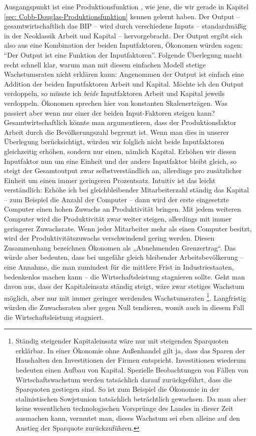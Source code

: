 Ausgangspunkt ist eine Produktionsfunktion \parencite[S. 94]{Samuelson1989}, wie jene, die wir gerade in Kapitel \ref{sec: Cobb-Douglas-Produktionsfunktion} kennen gelernt haben.  Der Output – gesamtwirtschaftlich das BIP – wird durch verschiedene Inputs – standardmäßig in der Neoklassik Arbeit und Kapital – hervorgebracht. Der Output ergibt sich also aus eine Kombination der beiden Inputfaktoren, Ökonomen würden sagen: "`Der Output ist eine Funktion der Inputfaktoren"'. 
Folgende Überlegung macht recht schnell klar, warum man mit diesem einfachen Modell stetige Wachstumsraten nicht erklären kann: Angenommen der Output ist einfach eine Addition der beiden Inputfaktoren Arbeit und Kapital. Möchte ich den Output verdoppeln, so müsste ich \textit{beide} Inputfaktoren Arbeit und Kapital jeweils verdoppeln. Ökonomen sprechen hier von konstanten Skalenerträgen. 
Was passiert aber wenn nur einer der beiden Input-Faktoren steigen kann? Gesamtwirtschaftlich könnte man argumentieren, dass der Produktionsfaktor Arbeit durch die Bevölkerungszahl begrenzt ist. Wenn man dies in unserer Überlegung berücksichtigt, würden wir folglich nicht beide Inputfaktoren gleichzeitig erhöhen, sondern nur einen, nämlich Kapital. Erhöhen wir diesen Inputfaktor nun um eine Einheit und der andere Inputfaktor bleibt gleich, so steigt der Gesamtoutput zwar selbstverständlich an, allerdings pro zusätzlicher Einheit um einen immer geringeren Prozentsatz. Intuitiv ist das leicht verständlich: Erhöhe ich bei gleichbleibender Mitarbeiterzahl ständig das Kapital – zum Beispiel die Anzahl der Computer – dann wird der erste eingesetzte Computer einen hohen Zuwachs an Produktivität bringen. Mit jedem weiteren Computer wird die Produktivität zwar weiter steigen, allerdings mit immer geringerer Zuwachsrate. Wenn jeder Mitarbeiter mehr als einen Computer besitzt, wird der Produktivitätszuwachs verschwindend gering werden. Diesen Zusammenhang bezeichnen Ökonomen als „Abnehmenden Grenzertrag“.
Das würde aber bedeuten, dass bei ungefähr gleich bleibender Arbeitsbevölkerung – eine Annahme, die man zumindest für die mittlere Frist in Industriestaaten, bedenkenlos machen kann – die Wirtschaftsleistung stagnieren sollte. Geht man davon aus, dass der Kapitaleinsatz ständig steigt, wäre zwar stetiges Wachstum möglich, aber nur mit immer geringer werdenden Wachstumsraten \footnote{Ständig steigender Kapitaleinsatz wäre nur mit steigenden Sparquoten erklärbar. In einer Ökonomie ohne Außenhandel gilt ja, dass das Sparen der Haushalten den Investitionen der Firmen entspricht. Investitionen wiederum bedeuten einen Aufbau von Kapital. Spezielle Beobachtungen von Fällen von Wirtschaftswachstum werden tatsächlich darauf zurückgeführt, dass die Sparquoten gestiegen sind. So ist zum Beispiel die Ökonomie in der stalinistischen Sowjetunion tatsächlich beträchtlich gewachsen. Da man aber keine wesentlichen technologischen Vorsprünge des Landes in dieser Zeit ausmachen kann, vermutet man, dieses Wachstum sei eben alleine auf den Anstieg der Sparquote zurückzuführen.}. Langfristig würden die Zuwachsraten aber gegen Null tendieren, womit auch in diesem Fall die Wirtschaftsleistung stagniert.

